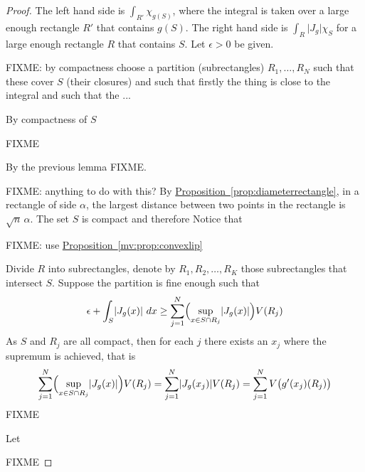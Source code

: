 \documentclass[12pt]{book}
\newcommand{\sabs}[1]{\lvert {#1} \rvert}
\newcommand{\R}{{\mathbb{R}}}
\theoremstyle{plain}
\newtheorem{lemma}[thm]{Lemma}
\theoremstyle{remark}
\theoremstyle{definition}
\theoremstyle{exercise}
\theoremstyle{example}
\newcommand{\propref}[1]{\hyperref[#1]{Proposition~\ref*{#1}}}
\begin{document}
\begin{proof}
The left hand side is $\int_{R'} \chi_{g(S)}$, where the integral is taken over a
large enough rectangle $R'$ that contains $g(S)$.
The right hand side is $\int_{R} \sabs{J_g} \chi_S$ for
a large enough rectangle $R$ that contains $S$.  Let $\epsilon > 0$ be
given.


FIXME: by compactness choose a partition (subrectangles) $R_1,\ldots,R_N$ such that these cover $S$
(their closures) and such that firstly  the thing is close to the integral
and such that the ...


By compactness of $S$

FIXME

By the previous lemma FIXME.




FIXME: anything to do with this?
By \propref{prop:diameterrectangle},
in a rectangle of side $\alpha$, the largest distance 
between two points in the rectangle is $\sqrt{n} \, \alpha$.
The set $S$ is compact and therefore 
Notice that 

FIXME: use
\propref{mv:prop:convexlip}





Divide $R$ into
subrectangles, denote
by $R_1,R_2,\ldots,R_K$ those subrectangles that intersect $S$.
Suppose the partition is fine enough such that
\begin{equation*}
\epsilon + \int_S \sabs{J_g(x)} ~ dx \geq
\sum_{j=1}^N \Bigl(\sup_{x \in S \cap R_j} \sabs{J_g(x)} \Bigr) V(R_j)
\end{equation*}
As $S$ and $R_j$ are all compact, then for each $j$ there exists an $x_j$
where the supremum is achieved, that is
\begin{equation*}
\sum_{j=1}^N \Bigl(\sup_{x \in S \cap R_j} \sabs{J_g(x)} \Bigr) V(R_j)
=
\sum_{j=1}^N \sabs{J_g(x_j)}  V(R_j)
=
\sum_{j=1}^N V\bigl(g'(x_j) (R_j)\bigr)
\end{equation*}
FIXME



Let 






FIXME
\end{proof}

\end{document}
